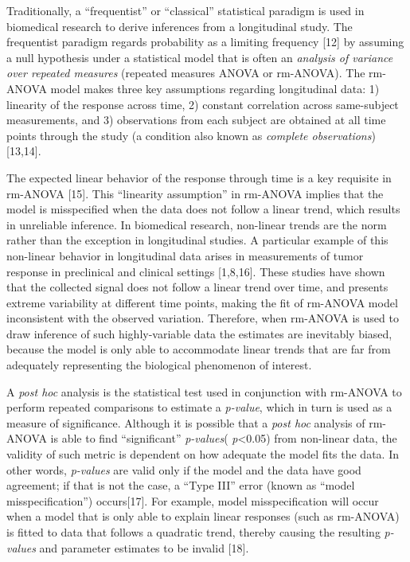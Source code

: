 \documentclass[
]{article}
\begin{document}
Traditionally, a ``frequentist'' or ``classical'' statistical paradigm is used in biomedical research to derive inferences from a longitudinal study. The frequentist paradigm regards probability as a limiting frequency {[}12{]} by assuming a null hypothesis under a statistical model that is often an \emph{analysis of variance over repeated measures} (repeated measures ANOVA or rm-ANOVA). The rm-ANOVA model makes three key assumptions regarding longitudinal data: 1) linearity of the response across time, 2) constant correlation across same-subject measurements, and 3) observations from each subject are obtained at all time points through the study (a condition also known as \emph{complete observations}) {[}13,14{]}.

The expected linear behavior of the response through time is a key requisite in rm-ANOVA {[}15{]}. This ``linearity assumption'' in rm-ANOVA implies that the model is misspecified when the data does not follow a linear trend, which results in unreliable inference. In biomedical research, non-linear trends are the norm rather than the exception in longitudinal studies. A particular example of this non-linear behavior in longitudinal data arises in measurements of tumor response in preclinical and clinical settings {[}1,8,16{]}. These studies have shown that the collected signal does not follow a linear trend over time, and presents extreme variability at different time points, making the fit of rm-ANOVA model inconsistent with the observed variation. Therefore, when rm-ANOVA is used to draw inference of such highly-variable data the estimates are inevitably biased, because the model is only able to accommodate linear trends that are far from adequately representing the biological phenomenon of interest.

A \emph{post hoc} analysis is the statistical test used in conjunction with rm-ANOVA to perform repeated comparisons to estimate a \emph{p-value}, which in turn is used as a measure of significance.
Although it is possible that a \emph{post hoc} analysis of rm-ANOVA is able to find ``significant'' \emph{p-values}( \emph{p}\textless0.05) from non-linear data, the validity of such metric is dependent on how adequate the model fits the data. In other words, \emph{p-values} are valid only if the model and the data have good agreement; if that is not the case, a ``Type III'' error (known as ``model misspecification'') occurs{[}17{]}. For example, model misspecification will occur when a model that is only able to explain linear responses (such as rm-ANOVA) is fitted to data that follows a quadratic trend, thereby causing the resulting \emph{p-values} and parameter estimates to be invalid {[}18{]}.
\end{document}
